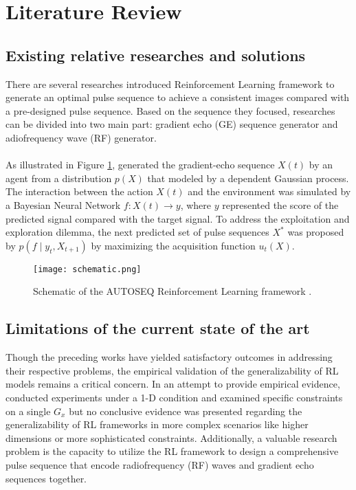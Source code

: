 \section{Literature Review}
\subsection{Existing relative researches and solutions}
There are several researches introduced Reinforcement Learning framework to generate an optimal pulse sequence to achieve a consistent images compared with a pre-designed pulse sequence. Based on the sequence they focused, researches can be divided into two main part: gradient echo (GE) sequence generator and adiofrequency wave (RF) generator. 
\\\\
As illustrated in Figure \ref{schematic}, \citet{0438} generated the gradient-echo sequence $X(t)$ by an agent from a distribution $p(X)$ that modeled by a dependent Gaussian process. The interaction between the action $X(t)$ and the environment was simulated by a Bayesian Neural Network $f:X(t) \rightarrow y$, where $y$ represented the score of the predicted signal compared with the target signal. To address the exploitation and exploration dilemma, the next predicted set of pulse sequences $X^*$ was proposed by $p\left(f \mid y_t, X_{t+1}\right)$ by maximizing the acquisition function $u_t(X)$.

\begin{figure}[ht]
    \centering
    \texttt{[image: schematic.png]}
    \caption{Schematic of the AUTOSEQ Reinforcement Learning framework \citep{0438}.}
    \label{schematic}
\end{figure}

\subsection{Limitations of the current state of the art}
Though the preceding works have yielded satisfactory outcomes in addressing their respective problems, the empirical validation of the generalizability of RL models remains a critical concern. In an attempt to provide empirical evidence, \citet{0438} conducted experiments under a 1-D condition and examined specific constraints on a single $G_x$ but no conclusive evidence was presented regarding the generalizability of RL frameworks in more complex scenarios like higher dimensions or more sophisticated constraints. Additionally, a valuable research problem is the capacity to utilize the RL framework to design a comprehensive pulse sequence that encode radiofrequency (RF) waves and gradient echo sequences together.